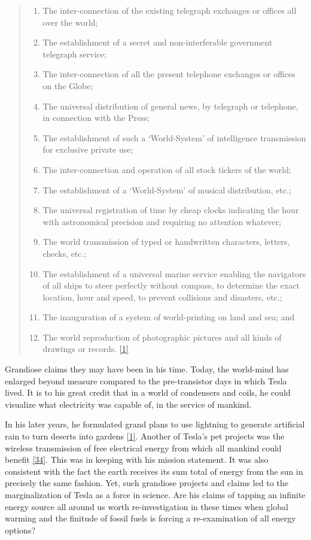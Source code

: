 \documentclass[
  a4paper,
]{article}
\providecommand{\tightlist}{%
  \setlength{\itemsep}{0pt}\setlength{\parskip}{0pt}}
\begin{document}
\begin{quote}
\begin{enumerate}
\tightlist
\item
  The inter-connection of the existing telegraph exchanges or offices
  all over the world;
\item
  The establishment of a secret and non-interferable government
  telegraph service;
\item
  The inter-connection of all the present telephone exchanges or offices
  on the Globe;
\item
  The universal distribution of general news, by telegraph or telephone,
  in connection with the Press;
\item
  The establishment of such a `World-System' of intelligence
  transmission for exclusive private use;
\item
  The inter-connection and operation of all stock tickers of the world;
\item
  The establishment of a `World-System' of musical distribution, etc.;
\item
  The universal registration of time by cheap clocks indicating the hour
  with astronomical precision and requiring no attention whatever;
\item
  The world transmission of typed or handwritten characters, letters,
  checks, etc.;
\item
  The establishment of a universal marine service enabling the
  navigators of all ships to steer perfectly without compass, to
  determine the exact location, hour and speed, to prevent collisions
  and disasters, etc.;
\item
  The inauguration of a system of world-printing on land and sea; and
\item
  The world reproduction of photographic pictures and all kinds of
  drawings or records. \protect\hyperlink{ref-john83}{{[}1{]}}
\end{enumerate}
\end{quote}

Grandiose claims they may have been in his time. Today, the world-mind
has enlarged beyond measure compared to the pre-transistor days in which
Tesla lived. It is to his great credit that in a world of condensers and
coils, he could visualize what electricity was capable of, in the
service of mankind.

In his later years, he formulated grand plans to use lightning to
generate artificial rain to turn deserts into gardens
\protect\hyperlink{ref-john83}{{[}1{]}}. Another of Tesla's pet projects
was the wireless transmission of free electrical energy from which all
mankind could benefit \protect\hyperlink{ref-tesla-energy}{{[}34{]}}.
This was in keeping with his mission statement. It was also consistent
with the fact the earth receives its sum total of energy from the sun in
precisely the same fashion. Yet, such grandiose projects and claims led
to the marginalization of Tesla as a force in science. Are his claims of
tapping an infinite energy source all around us worth re-investigation
in these times when global warming and the finitude of fossil fuels is
forcing a re-examination of all energy options?
\end{document}
